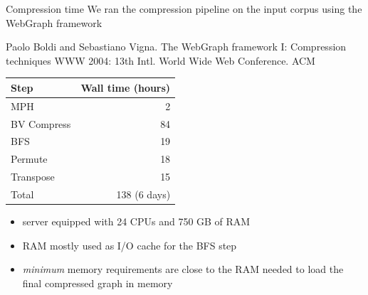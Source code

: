 \documentclass[aspectratio=169,xcolor=table]{beamer}
\begin{document}
    \begin{frame}{Compression time}
        We ran the compression pipeline on the input corpus using the WebGraph
        framework
        \begin{thebibliography}{}
            \footnotesize
             Paolo Boldi and Sebastiano Vigna.
            \newblock The WebGraph framework I: Compression techniques
            \newblock WWW 2004: 13th Intl. World Wide Web Conference. ACM
        \end{thebibliography}

        \begin{center}
            \begin{tabular}{lr}
                \alert{Step} & \alert{Wall time} (hours)\\
                \hline
                MPH & 2\\
                BV Compress & 84\\
                BFS & 19\\
                Permute & 18\\
                Transpose & 15\\
                \hline
                Total & 138 (6 days)\\
            \end{tabular}
        \end{center}

        \begin{itemize}
            \item server equipped with 24 CPUs and 750 GB of RAM
            \item RAM mostly used as I/O cache for the BFS step
            \item \emph{minimum} memory requirements are close to the RAM needed to load the
                final compressed graph in memory
        \end{itemize}
    \end{frame}
\end{document}
